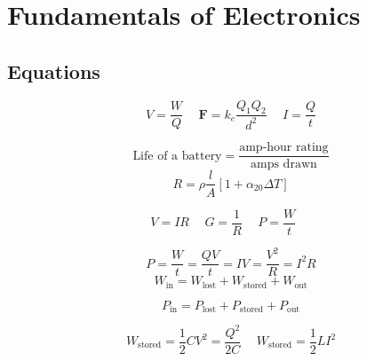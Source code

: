 \documentclass[twocolumn, 12pt]{article}
\begin{document}
\small{

\section*{Fundamentals of Electronics}
\subsection*{Equations}
     
    \begin{equation*}
        V=\frac{W}{Q} \hspace{15pt} \textbf{F}=\textit{k}_e\frac{Q_1Q_2}{d^2} \hspace{15pt} I=\frac{Q}{t}
    \end{equation*}
    
    \begin{equation*}
        \text{Life of a battery}=\frac{\text{amp-hour rating}}{\text{amps drawn}}
    \end{equation*}
    \begin{equation*}
        R=\rho \frac{l}{A}[1+\alpha_{20}\Delta T]
    \end{equation*}

    \begin{equation*}
        V=IR \hspace{15pt} G=\frac{1}{R} \hspace{15pt} P=\frac{W}{t} \hspace{15pt} 
    \end{equation*}
    
    \begin{equation*}
        P=\frac{W}{t}=\frac{QV}{t}=IV=\frac{V^2}{R}=I^2R
        \end{equation*}
        \begin{equation*}
            W_{\text{in}}=W_{\text{lost}}+W_{\text{stored}}+W_{\text{out}}
        \end{equation*}
        
        \begin{equation*}
            P_{\text{in}}=P_{\text{lost}}+P_{\text{stored}}+P_{\text{out}}
        \end{equation*}
        
        \begin{equation*}
            W_{\text{stored}}=\frac{1}{2}CV^2=\frac{Q^2}{2C} \hspace{15pt} W_{\text{stored}}=\frac{1}{2}LI^2 
        \end{equation*}
        
}
\end{document}
